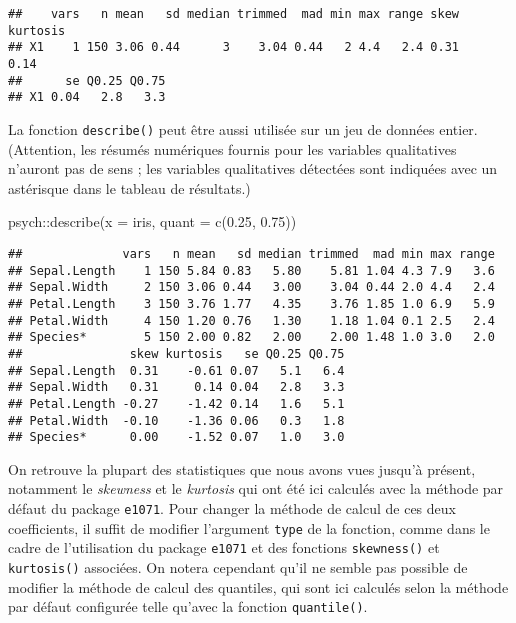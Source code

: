 \documentclass[
]{book}
\newenvironment{Shaded}{\begin{snugshade}}{\end{snugshade}}
\newcommand{\AttributeTok}[1]{\textcolor[rgb]{0.77,0.63,0.00}{#1}}
\newcommand{\FloatTok}[1]{\textcolor[rgb]{0.00,0.00,0.81}{#1}}
\newcommand{\FunctionTok}[1]{\textcolor[rgb]{0.00,0.00,0.00}{#1}}
\newcommand{\NormalTok}[1]{#1}
\newcommand{\SpecialCharTok}[1]{\textcolor[rgb]{0.00,0.00,0.00}{#1}}
\begin{document}
\begin{verbatim}
##    vars   n mean   sd median trimmed  mad min max range skew kurtosis
## X1    1 150 3.06 0.44      3    3.04 0.44   2 4.4   2.4 0.31     0.14
##      se Q0.25 Q0.75
## X1 0.04   2.8   3.3
\end{verbatim}

La fonction \texttt{describe()} peut être aussi utilisée sur un jeu de données entier. (Attention, les résumés numériques fournis pour les variables qualitatives n'auront pas de sens ; les variables qualitatives détectées sont indiquées avec un astérisque dans le tableau de résultats.)

\begin{Shaded}
\begin{Highlighting}[]
\NormalTok{psych}\SpecialCharTok{::}\FunctionTok{describe}\NormalTok{(}\AttributeTok{x =}\NormalTok{ iris, }\AttributeTok{quant =} \FunctionTok{c}\NormalTok{(}\FloatTok{0.25}\NormalTok{, }\FloatTok{0.75}\NormalTok{))}
\end{Highlighting}
\end{Shaded}

\begin{verbatim}
##              vars   n mean   sd median trimmed  mad min max range
## Sepal.Length    1 150 5.84 0.83   5.80    5.81 1.04 4.3 7.9   3.6
## Sepal.Width     2 150 3.06 0.44   3.00    3.04 0.44 2.0 4.4   2.4
## Petal.Length    3 150 3.76 1.77   4.35    3.76 1.85 1.0 6.9   5.9
## Petal.Width     4 150 1.20 0.76   1.30    1.18 1.04 0.1 2.5   2.4
## Species*        5 150 2.00 0.82   2.00    2.00 1.48 1.0 3.0   2.0
##               skew kurtosis   se Q0.25 Q0.75
## Sepal.Length  0.31    -0.61 0.07   5.1   6.4
## Sepal.Width   0.31     0.14 0.04   2.8   3.3
## Petal.Length -0.27    -1.42 0.14   1.6   5.1
## Petal.Width  -0.10    -1.36 0.06   0.3   1.8
## Species*      0.00    -1.52 0.07   1.0   3.0
\end{verbatim}

On retrouve la plupart des statistiques que nous avons vues jusqu'à présent, notamment le \emph{skewness} et le \emph{kurtosis} qui ont été ici calculés avec la méthode par défaut du package \texttt{e1071}. Pour changer la méthode de calcul de ces deux coefficients, il suffit de modifier l'argument \texttt{type} de la fonction, comme dans le cadre de l'utilisation du package \texttt{e1071} et des fonctions \texttt{skewness()} et \texttt{kurtosis()} associées. On notera cependant qu'il ne semble pas possible de modifier la méthode de calcul des quantiles, qui sont ici calculés selon la méthode par défaut configurée telle qu'avec la fonction \texttt{quantile()}.
\end{document}
